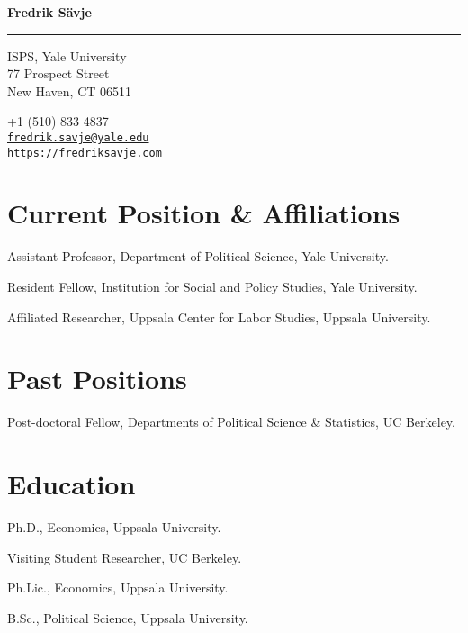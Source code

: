 \documentclass[10pt,letterpaper]{article}
\newenvironment{datelist}{
	\begin{list}{}{
		\setlength{\parskip}{0pt}
		\setlength{\itemsep}{4pt}
		\setlength{\parsep}{0.3em}
		\setlength{\leftmargin}{6em}
		\setlength{\labelwidth}{6em}
		\setlength{\labelsep}{1.5em}
		}
	}{
\end{list}
}
\newcommand{\dateitem}[2][]{\item[{#1}] {#2}}
\newenvironment{infolist}{
	\begin{list}{}{
		\setlength{\parskip}{0pt}
		\setlength{\itemsep}{4pt}
		\setlength{\parsep}{0.3em}
		\setlength{\leftmargin}{1.6em}
		\setlength{\labelwidth}{0pt}
		}
	}{
\end{list}
}
\newcommand{\infoitem}[1]{\item {#1}}
\begin{document}
	{\huge \bf Fredrik Sävje}

	\rule{\textwidth}{1pt}

	\bigskip


	\begin{minipage}[t]{0.495\textwidth}
		ISPS, Yale University \\
		77 Prospect Street \\
		New Haven, CT 06511
	\end{minipage}
	\begin{minipage}[t]{0.495\textwidth}
		+1 (510) 833 4837 \\
		\href{mailto:fredrik.savje@yale.edu}{\texttt{fredrik.savje@yale.edu}} \\
		\href{https://fredriksavje.com}{\texttt{https://fredriksavje.com}}
	\end{minipage}

	\bigskip


	\section*{Current Position \& Affiliations}

	\begin{infolist}
		\infoitem{Assistant Professor, Department of Political Science, Yale University.}
		\infoitem{Resident Fellow, Institution for Social and Policy Studies, Yale University.}
		\infoitem{Affiliated Researcher, Uppsala Center for Labor Studies, Uppsala University.}
	\end{infolist}


	\section*{Past Positions}

	\begin{datelist}
		\dateitem[2015--2017]{Post-doctoral Fellow, Departments of Political Science \& Statistics, UC Berkeley.}
	\end{datelist}


	\section*{Education}

	\begin{datelist}
		\dateitem[2015]{Ph.D., Economics, Uppsala University.}
		\dateitem[2013--2014]{Visiting Student Researcher, UC Berkeley.}
		\dateitem[2013]{Ph.Lic., Economics, Uppsala University.}
		\dateitem[2010]{B.Sc., Political Science, Uppsala University.}
	\end{datelist}
\end{document}
